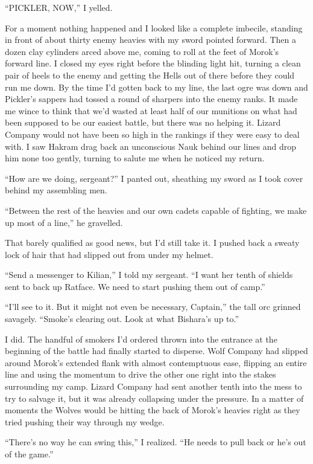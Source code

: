 \documentclass[12pt, openany]{book}
\begin{document}
“PICKLER, NOW,” I yelled.

For a moment nothing happened and I looked like a complete imbecile, standing in front of about thirty enemy heavies with my sword pointed forward. Then a dozen clay cylinders arced above me, coming to roll at the feet of Morok’s forward line. I closed my eyes right before the blinding light hit, turning a clean pair of heels to the enemy and getting the Hells out of there before they could run me down. By the time I’d gotten back to my line, the last ogre was down and Pickler’s sappers had tossed a round of sharpers into the enemy ranks. It made me wince to think that we’d wasted at least half of our munitions on what had been supposed to be our easiest battle, but there was no helping it. Lizard Company would not have been so high in the rankings if they were easy to deal with. I saw Hakram drag back an unconscious Nauk behind our lines and drop him none too gently, turning to salute me when he noticed my return.

“How are we doing, sergeant?” I panted out, sheathing my sword as I took cover behind my assembling men.

“Between the rest of the heavies and our own cadets capable of fighting, we make up most of a line,” he gravelled.

That barely qualified as good news, but I’d still take it. I pushed back a sweaty lock of hair that had slipped out from under my helmet.

“Send a messenger to Kilian,” I told my sergeant. “I want her tenth of shields sent to back up Ratface. We need to start pushing them out of camp.”

“I’ll see to it. But it might not even be necessary, Captain,” the tall orc grinned savagely. “Smoke’s clearing out. Look at what Bishara’s up to.”

I did. The handful of smokers I’d ordered thrown into the entrance at the beginning of the battle had finally started to disperse. Wolf Company had slipped around Morok’s extended flank with almost contemptuous ease, flipping an entire line and using the momentum to drive the other one right into the stakes surrounding my camp. Lizard Company had sent another tenth into the mess to try to salvage it, but it was already collapsing under the pressure. In a matter of moments the Wolves would be hitting the back of Morok’s heavies right as they tried pushing their way through my wedge. 

“There’s no way he can swing this,” I realized. “He needs to pull back or he’s out of the game.”
\end{document}
